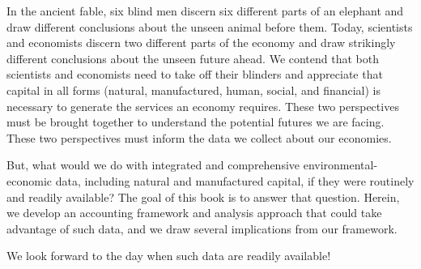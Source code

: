 In the ancient fable, 
six blind men discern six different parts 
of an elephant and draw different conclusions 
about the unseen animal before them.
Today, 
scientists and economists discern two different parts 
of the economy and draw strikingly different conclusions 
about the unseen future ahead. 
We contend that both scientists and economists 
need to take off their blinders and 
appreciate that capital in all forms 
(natural, manufactured, human, social, and financial)
is necessary to generate the services an economy requires. 
These two perspectives must be brought together 
to understand the potential futures we are facing. 
These two perspectives must inform the data we collect about our economies.

But, what would we do with integrated and comprehensive environmental-economic data, 
including natural and manufactured capital, 
if they were routinely and readily available? 
The goal of this book is to answer that question.
Herein, we develop an accounting framework 
and analysis approach that could take advantage of such data,
and we draw several implications from our framework.

We look forward to the day when such data are readily available!






%
%

